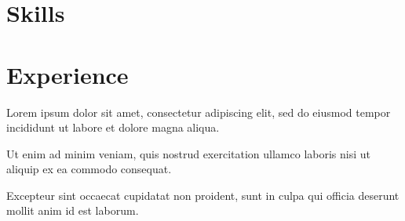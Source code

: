 \documentclass[]{SWE-resume-openfont}
\begin{document}
%
%
\lastupdated

%
%

%
%

\begin{minipage}[t]{0.60\textwidth} 

\section{Skills}
\sectionsep

\section{Experience}
\newline
{}  %

\vspace{\topsep} %
\begin{tightemize}
\item Lorem ipsum dolor sit amet, consectetur adipiscing elit, sed do eiusmod tempor incididunt ut labore et dolore magna aliqua. 
\item Ut enim ad minim veniam, quis nostrud exercitation ullamco laboris nisi ut aliquip ex ea commodo consequat. 
\item Excepteur sint occaecat cupidatat non proident, sunt in culpa qui officia deserunt mollit anim id est laborum.
\end{tightemize}
\sectionsep


\end{minipage}
\end{document}
